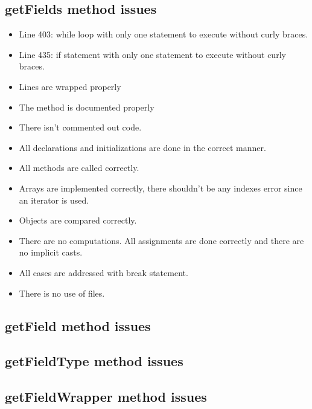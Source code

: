 \subsection{getFields method issues}
\begin{itemize}
	\item Line 403: while loop with only one statement to execute without curly braces.
	\item Line 435: if statement with only one statement to execute without curly braces.
	\item Lines are wrapped properly
	\item The method is documented properly
	\item There isn't commented out code.
	\item All declarations and initializations are done in the correct manner.
	\item All methods are called correctly.
	\item Arrays are implemented correctly, there shouldn't be any indexes error since an iterator is used.
	\item Objects are compared correctly.
	\item There are no computations. All assignments are done correctly and there are no implicit casts.
	\item All cases are addressed with break statement.
	\item There is no use of files.
\end{itemize}

\subsection{getField method issues}

\subsection{getFieldType method issues}

\subsection{getFieldWrapper method issues}